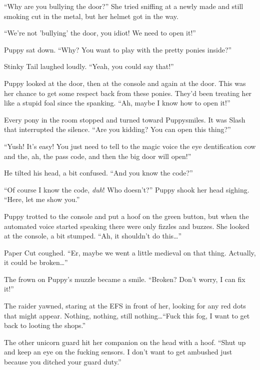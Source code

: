 ``Why are you bullying the door?'' She tried sniffing at a newly made and still smoking cut in the metal, but her helmet got in the way.

``We're not 'bullying' the door, you idiot! We need to open it!''

Puppy sat down. ``Why? You want to play with the pretty ponies inside?''

Stinky Tail laughed loudly. ``Yeah, you could say that!''

Puppy looked at the door, then at the console and again at the door. This was her chance to get some respect back from these ponies. They'd been treating her like a stupid foal since the spanking. ``Ah, maybe I know how to open it!''

Every pony in the room stopped and turned toward Puppysmiles. It was Slash that interrupted the silence. ``Are you kidding? You can open this thing?''

``Yush! It's easy! You just need to tell to the magic voice the eye dentification cow and the, ah, the pass code, and then the big door will open!''

He tilted his head, a bit confused. ``And you know the code?''

``Of course I know the code, \emph{duh}! Who doesn't?'' Puppy shook her head sighing. ``Here, let me show you.''

Puppy trotted to the console and put a hoof on the green button, but when the automated voice started speaking there were only fizzles and buzzes. She looked at the console, a bit stumped. ``Ah, it shouldn't do this\dots''

Paper Cut coughed. ``Er, maybe we went a little medieval on that thing. Actually, it could be broken\dots''

The frown on Puppy's muzzle became a smile. ``Broken? Don't worry, I can fix it!''



\horizonline


The raider yawned, staring at the EFS in front of her, looking for any red dots that might appear. Nothing, nothing, still nothing\dots ``Fuck this fog, I want to get back to looting the shops.''

The other unicorn guard hit her companion on the head with a hoof. ``Shut up and keep an eye on the fucking sensors. I don't want to get ambushed just because you ditched your guard duty.''

